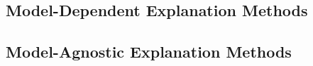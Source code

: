 \documentclass[english]{tktltiki2}
\theoremstyle{definition}
\theoremstyle{remark}
\begin{document}
%
%

\subsection{Model-Dependent Explanation Methods}%
\subsection{Model-Agnostic Explanation Methods} %
\end{document}
